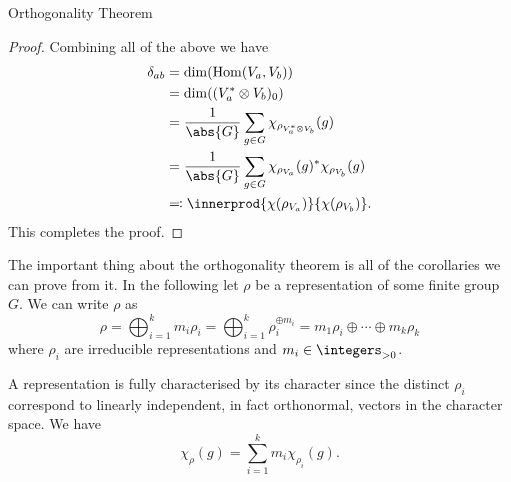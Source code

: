\documentclass[fleqn]{NotesClass}
\newcommand*{\positiveintegers}{\integers_{>0}}
\newcommand*{\directsum}{\oplus}
\newcommand*{\directproduct}{\otimes}
\DeclareMathOperator{\Hom}{Hom}
\begin{document}
\begin{thm}{Orthogonality Theorem}{}
\begin{proof}
            Combining all of the above we have
            \begin{align}
                \delta_{ab} &= \dim(\Hom(V_a, V_b))\\
                &= \dim((V_a^* \directproduct V_b)_0)\\
                &= \frac{1}{\abs{G}} \sum_{g\in G} \chi_{\rho_{V_a^* \directproduct V_b}}(g)\\
                &= \frac{1}{\abs{G}} \sum_{g\in G} \chi_{\rho_{V_a}}(g)^*\chi_{\rho_{V_b}}(g)\\
                &\eqqcolon \innerprod{\chi(\rho_{V_a})}{\chi(\rho_{V_b})}.
            \end{align}
            This completes the proof.
        \end{proof}
    \end{thm}
    
    The important thing about the orthogonality theorem is all of the corollaries we can prove from it.
    In the following let \(\rho\) be a representation of some finite group \(G\).
    We can write \(\rho\) as
    \begin{equation}
        \rho = \bigoplus_{i = 1}^{k} m_i \rho_i = \bigoplus_{i = 1}^{k} \rho_i^{\directsum m_i} = m_1 \rho_i \directsum \dotsb \directsum m_k\rho_k
    \end{equation}
    where \(\rho_i\) are irreducible representations and \(m_i \in \positiveintegers\).
    
    \begin{crl}{}{}
        A representation is fully characterised by its character since the distinct \(\rho_i\) correspond to linearly independent, in fact orthonormal, vectors in the character space.
        We have
        \begin{equation}
            \chi_\rho(g) = \sum_{i = 1}^{k} m_i \chi_{\rho_i}(g).
        \end{equation}
    \end{crl}
    
\end{document}
